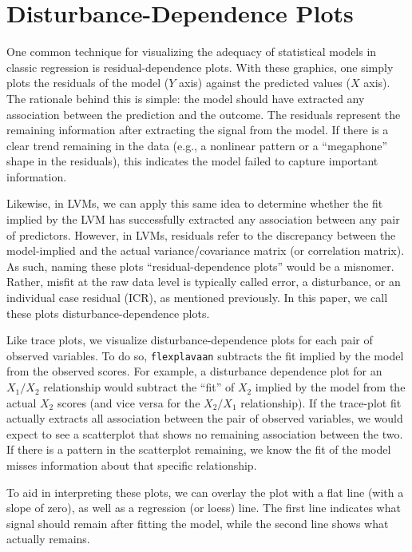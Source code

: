 \documentclass[
  english,
  doc]{apa6}
\begin{document}
\hypertarget{disturbance-dependence-plots}{%
\section{Disturbance-Dependence Plots}\label{disturbance-dependence-plots}}

One common technique for visualizing the adequacy of statistical models in classic regression is residual-dependence plots. With these graphics, one simply plots the residuals of the model (\(Y\) axis) against the predicted values (\(X\) axis). The rationale behind this is simple: the model should have extracted any association between the prediction and the outcome. The residuals represent the remaining information after extracting the signal from the model. If there is a clear trend remaining in the data (e.g., a nonlinear pattern or a ``megaphone'' shape in the residuals), this indicates the model failed to capture important information.

Likewise, in LVMs, we can apply this same idea to determine whether the fit implied by the LVM has successfully extracted any association between any pair of predictors. However, in LVMs, residuals refer to the discrepancy between the model-implied and the actual variance/covariance matrix (or correlation matrix). As such, naming these plots ``residual-dependence plots'' would be a misnomer. Rather, misfit at the raw data level is typically called error, a disturbance, or an individual case residual (ICR), as mentioned previously. In this paper, we call these plots disturbance-dependence plots.

Like trace plots, we visualize disturbance-dependence plots for each pair of observed variables. To do so, \texttt{flexplavaan} subtracts the fit implied by the model from the observed scores. For example, a disturbance dependence plot for an \(X_1/X_2\) relationship would subtract the ``fit'' of \(X_2\) implied by the model from the actual \(X_2\) scores (and vice versa for the \(X_2/X_1\) relationship). If the trace-plot fit actually extracts all association between the pair of observed variables, we would expect to see a scatterplot that shows no remaining association between the two. If there is a pattern in the scatterplot remaining, we know the fit of the model misses information about that specific relationship.

To aid in interpreting these plots, we can overlay the plot with a flat line (with a slope of zero), as well as a regression (or loess) line. The first line indicates what signal should remain after fitting the model, while the second line shows what actually remains.
\end{document}
